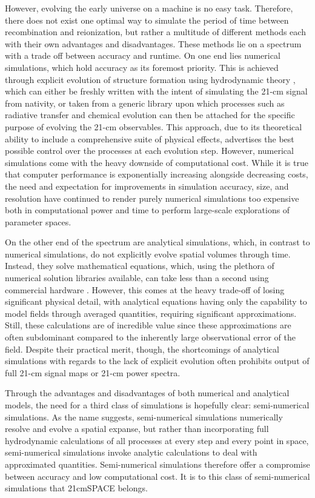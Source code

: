 \documentclass[floats,floatfix,showpacs,amssymb,prd,superscriptaddress,nofootinbib]{revtex4-2} %
\newcommand{\red}{\textcolor{red}}
\begin{document}
However, evolving the early universe on a machine is no easy task. Therefore, there does not exist one optimal way to simulate the period of time between recombination and reionization, but rather a multitude of different methods each with their own advantages and disadvantages. These methods lie on a spectrum with a trade off between accuracy and runtime. On one end lies numerical simulations, which hold accuracy as its foremost priority. This is achieved through explicit evolution of structure formation using hydrodynamic theory \citep{gessey-jones_2024}, which can either be freshly written with the intent of simulating the 21-cm signal from nativity, or taken from a generic library upon which processes such as radiative transfer and chemical evolution can then be attached for the specific purpose of evolving the 21-cm observables. This approach, due to its theoretical ability to include a comprehensive suite of physical effects, advertises the best possible control over the processes at each evolution step. However, numerical simulations come with the heavy downside of computational cost. 
While it is true that computer performance is exponentially increasing alongside decreasing costs, the need and expectation for improvements in simulation accuracy, size, and resolution have continued to render purely numerical simulations too expensive both in computational power and time to perform large-scale explorations of parameter spaces.

On the other end of the spectrum are analytical simulations, which, in contrast to numerical simulations, do not explicitly evolve spatial volumes through time. Instead, they solve mathematical equations, which, using the plethora of numerical solution libraries available, can take less than a second using commercial hardware \citep{gessey-jones_2024}. However, this comes at the heavy trade-off of losing significant physical detail, with analytical equations having only the capability to model fields through averaged quantities, requiring significant approximations. Still, these calculations are of incredible value since these approximations are often subdominant compared to the inherently large observational error of the field. Despite their practical merit, though, the shortcomings of analytical simulations with regards to the lack of explicit evolution often prohibits output of full 21-cm signal maps or 21-cm power spectra.

Through the advantages and disadvantages of both numerical and analytical models, the need for a third class of simulations is hopefully clear: semi-numerical simulations. As the name suggests, semi-numerical simulations numerically resolve and evolve a spatial expanse, but rather than incorporating full hydrodynamic calculations of all processes at every step and every point in space, semi-numerical simulations invoke analytic calculations to deal with approximated quantities. Semi-numerical simulations therefore offer a compromise between accuracy and low computational cost. It is to this class of semi-numerical simulations that 21cmSPACE belongs.
\end{document}
